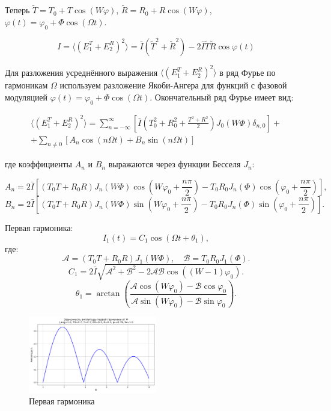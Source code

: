\documentclass[a4paper, 12pt]{article}
\renewcommand{\phi}{\varphi}
\begin{document}
Теперь $\tilde T = T_0 + T\cos(W\phi)$, $\tilde R = R_0 + R\cos(W\phi)$, $\phi(t) = \phi_0 + \Phi\cos(\Omega t)$.

\[ I = \langle (E_1^T + E_2^R)^2 \rangle = \bar I (\tilde{T}^2 + \tilde{R}^2) - 2 \bar I \tilde{T}\tilde{R} \cos\phi(t)\]

Для разложения усреднённого выражения \(\langle (E_1^T + E_2^R)^2 \rangle\) в ряд Фурье по гармоникам \(\Omega\) используем разложение Якоби-Ангера для функций с фазовой модуляцией \(\phi(t) = \phi_0 + \Phi \cos(\Omega t)\). Окончательный ряд Фурье имеет вид:

\begin{multline*}
  \langle (E_1^T + E_2^R)^2 \rangle = \sum_{n=-\infty}^{\infty} \left[ \bar I \left( T_0^2 + R_0^2 + \frac{T^2 + R^2}{2} \right) J_0(W\Phi) \delta_{n,0} \right] +\\+ \sum_{n \neq 0} \left[ A_n \cos(n\Omega t) + B_n \sin(n\Omega t) \right]
\end{multline*}

где коэффициенты \(A_n\) и \(B_n\) выражаются через функции Бесселя \(J_n\):

\[
  A_n = 2\bar I \left[ (T_0 T + R_0 R) J_n(W\Phi) \cos\left(W\phi_0 + \frac{n\pi}{2}\right) - T_0 R_0 J_n(\Phi) \cos\left(\phi_0 + \frac{n\pi}{2}\right) \right],
\]
\[
  B_n = 2\bar I \left[ (T_0 T + R_0 R) J_n(W\Phi) \sin\left(W\phi_0 + \frac{n\pi}{2}\right) - T_0 R_0 J_n(\Phi) \sin\left(\phi_0 + \frac{n\pi}{2}\right) \right].
\]

Первая гармоника:
\[
  I_1(t) = C_1 \cos\left(\Omega t + \theta_1\right),
\]
где:
\[
  \mathcal{A} = (T_0 T + R_0 R) J_1(W\Phi), \quad \mathcal{B} = T_0 R_0 J_1(\Phi).
\]
\[
  C_1 = 2\bar I \sqrt{
    \mathcal{A}^2 + \mathcal{B}^2 - 2 \mathcal{A} \mathcal{B} \cos\left((W-1)\phi_0\right)
  }.
\]
\[
  \theta_1 = \arctan\left(
  \frac{\mathcal{A} \cos(W\phi_0) - \mathcal{B} \cos\phi_0}
  {\mathcal{A} \sin(W\phi_0) - \mathcal{B} \sin\phi_0}
  \right).
\]

\begin{figure}[H]
  \centering
  \includegraphics[width=0.5\textwidth]{../figures/first_harmonic_intensity_I1.0_T00.7_T0.7_R00.3_R0.3_phi0.79_W1.0.png}
  \caption{Первая гармоника}
\end{figure}
\end{document}
